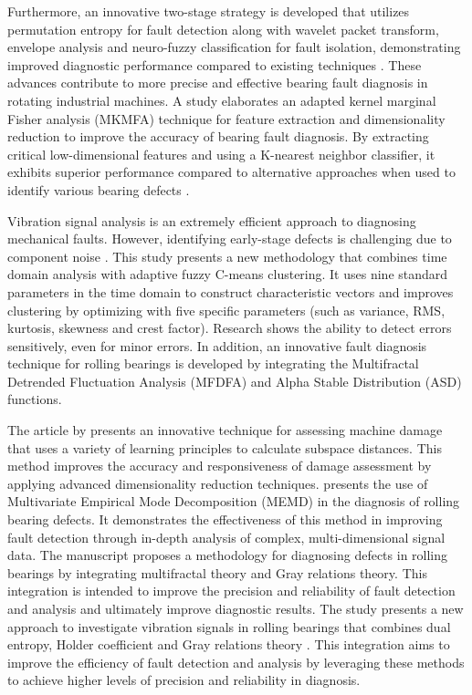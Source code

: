 \documentclass[sn-basic,pdflatex]{sn-jnl}
\theoremstyle{remark}
\theoremstyle{definition}
\begin{document}
Furthermore, an innovative two-stage strategy is developed that utilizes
permutation entropy for fault detection along with wavelet packet
transform, envelope analysis and neuro-fuzzy classification for fault
isolation, demonstrating improved diagnostic performance compared to
existing techniques \citep{WOS:000385104500001, Rajabi2022}. These
advances contribute to more precise and effective bearing fault
diagnosis in rotating industrial machines. A study elaborates an adapted
kernel marginal Fisher analysis (MKMFA) technique for feature extraction
and dimensionality reduction to improve the accuracy of bearing fault
diagnosis. By extracting critical low-dimensional features and using a
K-nearest neighbor classifier, it exhibits superior performance compared
to alternative approaches when used to identify various bearing defects
\citep{WOS:000392016300001}.

Vibration signal analysis is an extremely efficient approach to
diagnosing mechanical faults. However, identifying early-stage defects
is challenging due to component noise
\citep{WOS:000369301600001, WOS:000367992900001}. This study presents a
new methodology that combines time domain analysis with adaptive fuzzy
C-means clustering. It uses nine standard parameters in the time domain
to construct characteristic vectors and improves clustering by
optimizing with five specific parameters (such as variance, RMS,
kurtosis, skewness and crest factor). Research shows the ability to
detect errors sensitively, even for minor errors. In addition, an
innovative fault diagnosis technique for rolling bearings is developed
by integrating the Multifractal Detrended Fluctuation Analysis (MFDFA)
and Alpha Stable Distribution (ASD) functions.

The article by \citet{WOS:000366765500038} presents an innovative
technique for assessing machine damage that uses a variety of learning
principles to calculate subspace distances. This method improves the
accuracy and responsiveness of damage assessment by applying advanced
dimensionality reduction techniques. \citet{WOS:000379556300014}
presents the use of Multivariate Empirical Mode Decomposition (MEMD) in
the diagnosis of rolling bearing defects. It demonstrates the
effectiveness of this method in improving fault detection through
in-depth analysis of complex, multi-dimensional signal data. The
manuscript \citet{WOS:000391229300006} proposes a methodology for
diagnosing defects in rolling bearings by integrating multifractal
theory and Gray relations theory. This integration is intended to
improve the precision and reliability of fault detection and analysis
and ultimately improve diagnostic results. The study presents a new
approach to investigate vibration signals in rolling bearings that
combines dual entropy, Holder coefficient and Gray relations theory
\citep{WOS:000426819400027}. This integration aims to improve the
efficiency of fault detection and analysis by leveraging these methods
to achieve higher levels of precision and reliability in diagnosis.
\end{document}
